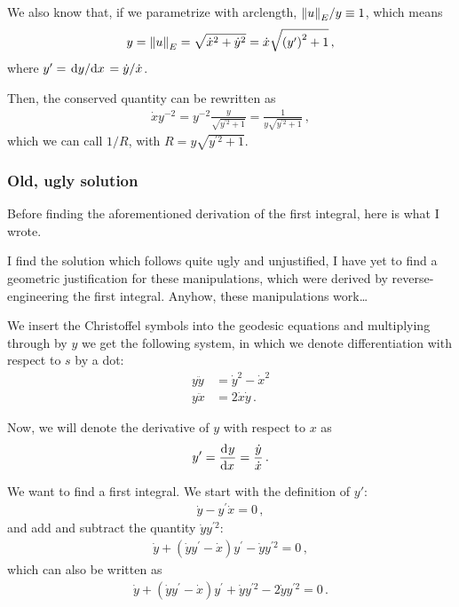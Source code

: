 \documentclass[main.tex]{subfiles}
\begin{document}
We also know that, if we parametrize with arclength, \(\norm{u}_{E} / y \equiv 1 \), which means 
%
\begin{align}
  y = \norm{u}_{E} = \sqrt{\dot{x}^2 + \dot{y}^2} = \dot{x} \sqrt{\qty(y^{\prime })^2 + 1}
\,,
\end{align}
%
where \(y^{\prime } = \dv*{y}{x} = \dot{y} / \dot{x}\).

Then, the conserved quantity can be rewritten as 
%
\begin{align}
  \dot{x} y^{-2} = y^{-2} \frac{y}{\sqrt{y^{\prime 2} +1}}
  = \frac{1}{y \sqrt{y^{\prime 2} + 1}}
\,,
\end{align}
%
which we can call \(1/R\), with \(R = y \sqrt{y^{\prime 2}+1}\). 

\subsubsection{Old, ugly solution}

Before finding the aforementioned derivation of the first integral, here is what I wrote. 

I find the solution which follows quite ugly and unjustified, I have yet to find a geometric justification for these manipulations, which were derived by reverse-engineering the first integral.
Anyhow, these manipulations work\dots

We insert the Christoffel symbols into the geodesic equations and multiplying through by \(y\) we get the following system, in which we denote differentiation with respect to \(s\) by a dot: 
%
\begin{subequations}
\begin{align}
  y \ddot{y} &= \dot{y}^2 - \dot{x}^2  \\
  y \ddot{x} &= 2 \dot{x} \dot{y} 
\,.
\end{align}
\end{subequations}

Now, we will denote the derivative of \(y \) with respect to \(x\) as 
%
\begin{align}
  y' = \dv[]{y}{x} = \frac{\dot{y}}{\dot{x}}
\,.
\end{align}

We want to find a first integral. We start with the definition of \(y'\): 
%
\begin{align}
  \dot{y} - y^{\prime } \dot{x} = 0
\,,
\end{align}
%
and add and subtract the quantity \(\dot{y} y^{\prime 2}\): 
%
\begin{align}
  \dot{y} + (\dot{y} y^{\prime } - \dot{x}) y^{\prime } - \dot{y} y^{\prime 2} =0
\,,
\end{align}
%
which can also be written as 
%
\begin{align} \label{eq:hyperbolic-plane-geodesics-integral-step1}
  \dot{y} + (\dot{y} y^{\prime } - \dot{x}) y^{\prime } + \dot{y} y^{\prime 2} - 2 \dot{y} y^{\prime 2} = 0
\,.
\end{align}
\end{document}
